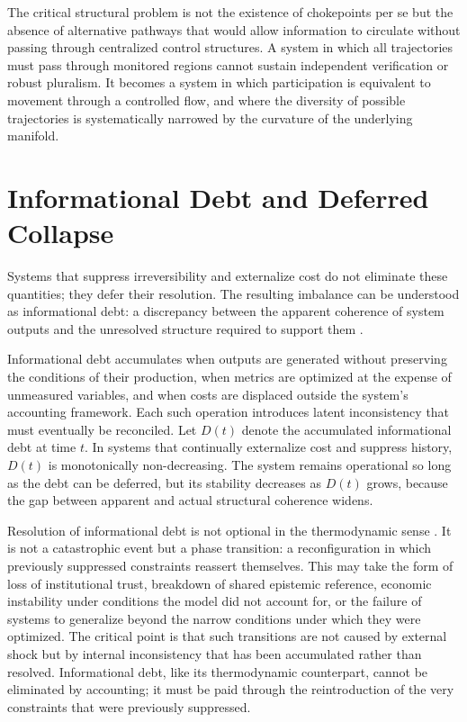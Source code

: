 \documentclass[12pt, a4paper]{article}
\begin{document}
The critical structural problem is not the existence of chokepoints per se but the absence of alternative pathways that would allow information to circulate without passing through centralized control structures. A system in which all trajectories must pass through monitored regions cannot sustain independent verification or robust pluralism. It becomes a system in which participation is equivalent to movement through a controlled flow, and where the diversity of possible trajectories is systematically narrowed by the curvature of the underlying manifold.

\section{Informational Debt and Deferred Collapse}

Systems that suppress irreversibility and externalize cost do not eliminate these quantities; they defer their resolution. The resulting imbalance can be understood as informational debt: a discrepancy between the apparent coherence of system outputs and the unresolved structure required to support them \cite{Landauer1961,Shannon1948}.

Informational debt accumulates when outputs are generated without preserving the conditions of their production, when metrics are optimized at the expense of unmeasured variables, and when costs are displaced outside the system's accounting framework. Each such operation introduces latent inconsistency that must eventually be reconciled. Let $D(t)$ denote the accumulated informational debt at time $t$. In systems that continually externalize cost and suppress history, $D(t)$ is monotonically non-decreasing. The system remains operational so long as the debt can be deferred, but its stability decreases as $D(t)$ grows, because the gap between apparent and actual structural coherence widens.

Resolution of informational debt is not optional in the thermodynamic sense \cite{Prigogine1984}. It is not a catastrophic event but a phase transition: a reconfiguration in which previously suppressed constraints reassert themselves. This may take the form of loss of institutional trust, breakdown of shared epistemic reference, economic instability under conditions the model did not account for, or the failure of systems to generalize beyond the narrow conditions under which they were optimized. The critical point is that such transitions are not caused by external shock but by internal inconsistency that has been accumulated rather than resolved. Informational debt, like its thermodynamic counterpart, cannot be eliminated by accounting; it must be paid through the reintroduction of the very constraints that were previously suppressed.
\end{document}
